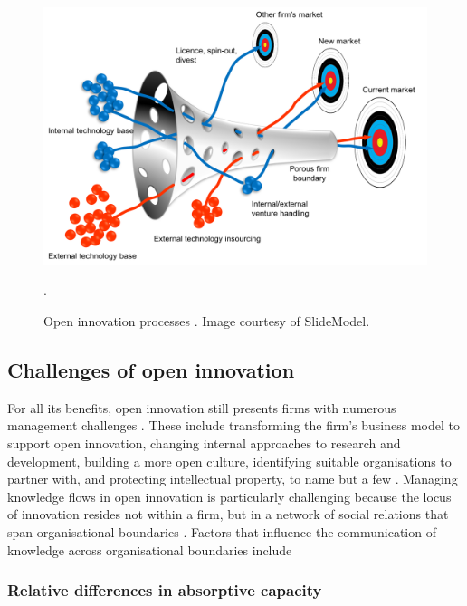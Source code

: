 \begin{figure}
	\centering
	\includegraphics[width=0.9\linewidth]{Images/oi_process}
	\caption{Open innovation processes \citep{chesbrough2004open}. Image courtesy of SlideModel.}.
	\label{fig:oi_process}
\end{figure}

\subsection{Challenges of open innovation}

For all its benefits, open innovation still presents firms with numerous management challenges \citep{hossain2013open,vanhaverbeke2014surfing}. These include transforming the firm's business model to support open innovation, changing internal approaches to research and development, building a more open culture, identifying suitable organisations to partner with, and protecting intellectual property, to name but a few \citep{dahlander2010open,sieg2010managerial,lichtenthaler2011your,durst2013success,roper2013externalities,aloini2016structured}. Managing knowledge flows in open innovation is particularly challenging because the locus of innovation resides not within a firm, but in a network of social relations that span organisational boundaries \citep{powell1996interorganizational,elmquist2009exploring}. Factors that influence the communication of knowledge across organisational boundaries include 

\subsubsection{Relative differences in absorptive capacity}

